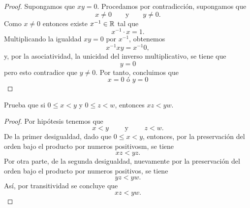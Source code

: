 \documentclass[12pt,a4paper]{article}
\begin{document}
    \begin{proof}
        Supongamos que $xy=0$. Procedamos por contradicción, supongamos que
        \begin{equation*}
            x\neq0\qquad\text{y}\qquad y\neq0.
        \end{equation*}
        Como $x\neq0$ entonces existe $x^{-1}\in\mathbb{R}$ tal que
        \begin{equation*}
            x^{-1}\cdot x=1.
        \end{equation*}
        Multiplicando la igualdad $xy=0$ por $x^{-1}$, obtenemos
        \begin{equation*}
            x^{-1}xy=x^{-1}0,
        \end{equation*}
        y, por la asociatividad, la unicidad del inverso multiplicativo, se tiene que
        \begin{equation*}
            y=0
        \end{equation*}
        pero esto contradice que $y\neq0$. Por tanto, concluimos que
        \begin{equation*}
            x=0\text{ ó } y=0
        \end{equation*}
    \end{proof}
    
    \begin{problema}
        Prueba que si $0\leq x\lt y$ y $0\leq z\lt w$, entonces $xz\lt yw$.
    \end{problema}

    \begin{proof}
        Por hipótesis tenemos que
        \begin{equation*}
            x\lt y\qquad\text{ y }\qquad z\lt w.
        \end{equation*}
        De la primer desigualdad, dado que $0\leq x\lt y$, entonces, por la preservación del orden bajo el producto por numeros positivosm, se tiene
        \begin{equation*}
            xz\lt yz.
        \end{equation*}
        Por otra parte, de la segunda desigualdad, nuevamente por la preservación del orden bajo el producto por numeros positivos, se tiene
        \begin{equation*}
            yz\lt yw.
        \end{equation*}
        Así, por transitividad se concluye que
        \begin{equation*}
            xz\lt yw.
        \end{equation*}
    \end{proof}
\end{document}
